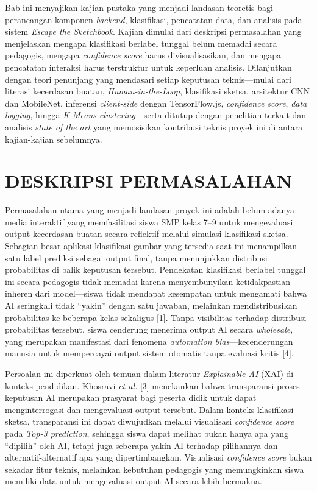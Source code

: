 \documentclass[12pt,oneside]{report}
\begin{document}
Bab ini menyajikan kajian pustaka yang menjadi landasan teoretis bagi perancangan komponen \textit{backend}, klasifikasi, pencatatan data, dan analisis pada sistem \textit{Escape the Sketchbook}. Kajian dimulai dari deskripsi permasalahan yang menjelaskan mengapa klasifikasi berlabel tunggal belum memadai secara pedagogis, mengapa \textit{confidence score} harus divisualisasikan, dan mengapa pencatatan interaksi harus terstruktur untuk keperluan analisis. Dilanjutkan dengan teori penunjang yang mendasari setiap keputusan teknis—mulai dari literasi kecerdasan buatan, \textit{Human-in-the-Loop}, klasifikasi sketsa, arsitektur CNN dan MobileNet, inferensi \textit{client-side} dengan TensorFlow.js, \textit{confidence score}, \textit{data logging}, hingga \textit{K-Means clustering}—serta ditutup dengan penelitian terkait dan analisis \textit{state of the art} yang memosisikan kontribusi teknis proyek ini di antara kajian-kajian sebelumnya.

\section{DESKRIPSI PERMASALAHAN}
\label{sec:deskripsi-permasalahan}

Permasalahan utama yang menjadi landasan proyek ini adalah belum adanya media interaktif yang memfasilitasi siswa SMP kelas 7--9 untuk mengevaluasi output kecerdasan buatan secara reflektif melalui simulasi klasifikasi sketsa. Sebagian besar aplikasi klasifikasi gambar yang tersedia saat ini menampilkan satu label prediksi sebagai output final, tanpa menunjukkan distribusi probabilitas di balik keputusan tersebut. Pendekatan klasifikasi berlabel tunggal ini secara pedagogis tidak memadai karena menyembunyikan ketidakpastian inheren dari model—siswa tidak mendapat kesempatan untuk mengamati bahwa AI seringkali tidak ``yakin'' dengan satu jawaban, melainkan mendistribusikan probabilitas ke beberapa kelas sekaligus [1]. Tanpa visibilitas terhadap distribusi probabilitas tersebut, siswa cenderung menerima output AI secara \textit{wholesale}, yang merupakan manifestasi dari fenomena \textit{automation bias}—kecenderungan manusia untuk mempercayai output sistem otomatis tanpa evaluasi kritis [4].

Persoalan ini diperkuat oleh temuan dalam literatur \textit{Explainable AI} (XAI) di konteks pendidikan. Khosravi \textit{et al.} [3] menekankan bahwa transparansi proses keputusan AI merupakan prasyarat bagi peserta didik untuk dapat menginterrogasi dan mengevaluasi output tersebut. Dalam konteks klasifikasi sketsa, transparansi ini dapat diwujudkan melalui visualisasi \textit{confidence score} pada \textit{Top-3 prediction}, sehingga siswa dapat melihat bukan hanya apa yang ``dipilih'' oleh AI, tetapi juga seberapa yakin AI terhadap pilihannya dan alternatif-alternatif apa yang dipertimbangkan. Visualisasi \textit{confidence score} bukan sekadar fitur teknis, melainkan kebutuhan pedagogis yang memungkinkan siswa memiliki data untuk mengevaluasi output AI secara lebih bermakna.
\end{document}
